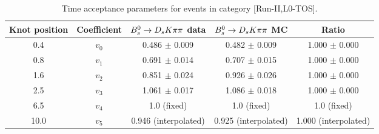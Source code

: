 \begin{table}[h]
\centering
\small
\caption{Time acceptance parameters for events in category [\textsf{Run-II},\textsf{L0-TOS}].}
\begin{tabular}{c c c c c}
\hline
\hline
Knot position & Coefficient & ${{B}^0_{s}}\rightarrow{\ensuremath{{D}_{s}}}{\ensuremath{K}}{\ensuremath{\pi}}{\ensuremath{\pi}}$ data & ${{B}^0_{s}}\rightarrow{\ensuremath{{D}_{s}}}{\ensuremath{K}}{\ensuremath{\pi}}{\ensuremath{\pi}}$ MC & Ratio \\
\hline
0.4 & $v_{0}$ & 0.486 $\pm$ 0.009 & 0.482 $\pm$ 0.009 & 1.000 $\pm$ 0.000\\
0.8 & $v_{1}$ & 0.691 $\pm$ 0.014 & 0.707 $\pm$ 0.015 & 1.000 $\pm$ 0.000\\
1.6 & $v_{2}$ & 0.851 $\pm$ 0.024 & 0.926 $\pm$ 0.026 & 1.000 $\pm$ 0.000\\
2.5 & $v_{3}$ & 1.061 $\pm$ 0.017 & 1.086 $\pm$ 0.018 & 1.000 $\pm$ 0.000\\
6.5 & $v_{4}$ &  1.0 (fixed) & 1.0 (fixed) & 1.0 (fixed)\\
10.0 & $v_{5}$ & 0.946 (interpolated) & 0.925 (interpolated) & 1.000 (interpolated) \\
\hline
\hline
\end{tabular}
\label{table:splines}
\end{table}
